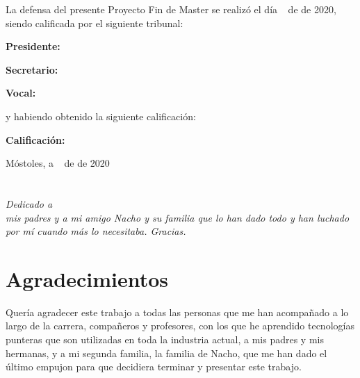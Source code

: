 \documentclass[a4paper]{book}
\begin{document}
\vspace{1cm}
La defensa del presente Proyecto Fin de Master se realizó el día \qquad$\;\,$ de \qquad\qquad\qquad\qquad \newline de 2020, siendo calificada por el siguiente tribunal:


\vspace{0.5cm}
\textbf{Presidente:}

\vspace{1.2cm}
\textbf{Secretario:}

\vspace{1.2cm}
\textbf{Vocal:}


\vspace{1.2cm}
y habiendo obtenido la siguiente calificación:

\vspace{1cm}
\textbf{Calificación:}


\vspace{1cm}
\begin{flushright}
Móstoles, a \qquad$\;\,$ de \qquad\qquad\qquad\qquad de 2020
\end{flushright}


\chapter*{}
\begin{flushright}
\textit{Dedicado a \\
mis padres y a mi amigo Nacho y su familia que lo han dado todo y han luchado por mí cuando más lo necesitaba. Gracias.}
\end{flushright}


\chapter*{Agradecimientos}

Quería agradecer este trabajo a todas las personas que me han acompañado a lo largo de la
carrera, compañeros y profesores, con los que he aprendido tecnologías punteras que son
utilizadas en toda la industria actual, a mis padres y mis hermanas, y a mi segunda familia,
la familia de Nacho, que me han dado el último empujon para que decidiera terminar y
presentar este trabajo.
\end{document}
